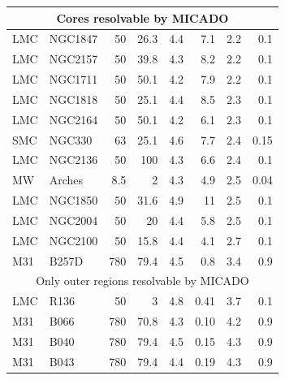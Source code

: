 \begin{appendix}
\begin{table}
\begin{tabular}{l l r r r r r r}
        \multicolumn{8}{c}{Cores resolvable by MICADO}                                                  \\
        \hline
        LMC    & NGC1847      & 50       & 26.3 & 4.4       & 7.1     & 2.2            & 0.1           \\
        LMC    & NGC2157      & 50       & 39.8 & 4.3       & 8.2     & 2.2            & 0.1           \\
        LMC    & NGC1711      & 50       & 50.1 & 4.2       & 7.9     & 2.2            & 0.1           \\
        LMC    & NGC1818      & 50       & 25.1 & 4.4       & 8.5     & 2.3            & 0.1           \\
        LMC    & NGC2164      & 50       & 50.1 & 4.2       & 6.1     & 2.3            & 0.1           \\
        SMC    & NGC330       & 63       & 25.1 & 4.6       & 7.7     & 2.4            & 0.15          \\
        LMC    & NGC2136      & 50       & 100  & 4.3       & 6.6     & 2.4            & 0.1           \\
        MW     & Arches       & 8.5      & 2    & 4.3       & 4.9     & 2.5            & 0.04          \\
        LMC    & NGC1850      & 50       & 31.6 & 4.9       & 11      & 2.5            & 0.1           \\
        LMC    & NGC2004      & 50       & 20   & 4.4       & 5.8     & 2.5            & 0.1           \\
        LMC    & NGC2100      & 50       & 15.8 & 4.4       & 4.1     & 2.7            & 0.1           \\
        M31    & B257D        & 780      & 79.4 & 4.5       & 0.8     & 3.4            & 0.9           \\
        \hline
        \multicolumn{8}{c}{Only outer regions resolvable by MICADO}                                    \\
        \hline
        LMC    & R136         & 50       & 3    & 4.8       & 0.41    & 3.7            & 0.1           \\
        M31    & B066         & 780      & 70.8 & 4.3       & 0.10    & 4.2            & 0.9           \\
        M31    & B040         & 780      & 79.4 & 4.5       & 0.15    & 4.3            & 0.9           \\
        M31    & B043         & 780      & 79.4 & 4.4       & 0.19    & 4.3            & 0.9           \\

\end{tabular}
\end{table}
\end{appendix}
